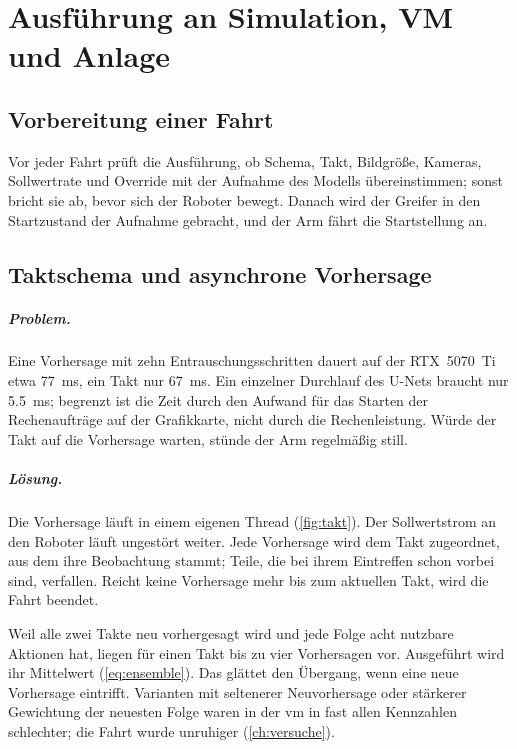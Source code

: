 \chapter{Ausführung an Simulation, VM und Anlage}
\label{ch:ausfuehrung}

\section{Vorbereitung einer Fahrt}
\label{sec:fahrt-vorbereitung}

Vor jeder Fahrt prüft die Ausführung, ob Schema, Takt, Bildgröße, Kameras, Sollwertrate und
Override mit der Aufnahme des Modells übereinstimmen; sonst bricht sie ab, bevor sich der
Roboter bewegt. Danach wird der Greifer in den Startzustand der Aufnahme gebracht, und der Arm
fährt die Startstellung an.

\section{Taktschema und asynchrone Vorhersage}
\label{sec:takt}

\paragraph{Problem.} Eine Vorhersage mit zehn Entrauschungsschritten dauert auf der
RTX~5070~Ti etwa \SI{77}{\milli\second}, ein Takt nur \SI{67}{\milli\second}. Ein einzelner
Durchlauf des U-Nets braucht nur \SI{5.5}{\milli\second}; begrenzt ist die Zeit durch den
Aufwand für das Starten der Rechenaufträge auf der Grafikkarte, nicht durch die Rechenleistung.
Würde der Takt auf die Vorhersage warten, stünde der Arm regelmäßig still.

\paragraph{Lösung.} Die Vorhersage läuft in einem eigenen Thread (\cref{fig:takt}). Der
Sollwertstrom an den Roboter läuft ungestört weiter. Jede Vorhersage wird dem Takt zugeordnet,
aus dem ihre Beobachtung stammt; Teile, die bei ihrem Eintreffen schon vorbei sind, verfallen.
Reicht keine Vorhersage mehr bis zum aktuellen Takt, wird die Fahrt beendet.

Weil alle zwei Takte neu vorhergesagt wird und jede Folge acht nutzbare Aktionen hat, liegen für
einen Takt bis zu vier Vorhersagen vor. Ausgeführt wird ihr Mittelwert (\cref{eq:ensemble}).
Das glättet den Übergang, wenn eine neue Vorhersage eintrifft. Varianten mit seltenerer
Neuvorhersage oder stärkerer Gewichtung der neuesten Folge waren in der \ac{vm} in fast allen
Kennzahlen schlechter; die Fahrt wurde unruhiger (\cref{ch:versuche}).

